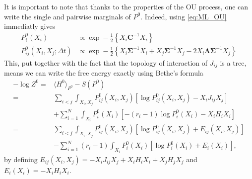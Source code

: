 \documentclass[10pt]{article}
\newcommand{\Lam}{\bm{\Lambda}}
\newcommand{\Sig}{\bm{\Sigma}}
\begin{document}
It is important to note that thanks to the properties of the OU process, one can write the single and pairwise marginals of $P^0$. Indeed, using \ref{eq:ML_OU} immediatly gives
\begin{equation}
  \label{eq:ML_Fullmarginals}
  \begin{split}
    P^0_i(X_i) &\propto \exp-\frac{1}{2}\left\{ X_i\bm{C}^{-1}X_i \right\}\\
    P^0_{ij}(X_i,X_j;\Delta t) &\propto \exp-\frac{1}{2}\left\{ X_i\Sig^{-1} X_i + X_j\Sig^{-1}X_j - 2 X_i \Lam\Sig^{-1} X_j \right\}
  \end{split}
\end{equation}
This, put together with the fact that the topology of interaction of $J_{ij}$ is a tree, means we can write the free energy exactly using Bethe's formula
\begin{equation}
  \label{eq:ML_F0}
  \begin{split}
  -\log Z^0  =&\langle H^0\rangle_{P^0} - S(P^0)\\
   =& \sum_{i<j}\int_{X_i,X_j} P^0_{ij}(X_i,X_j)\left[\log P^0_{ij}(X_i,X_j) - X_iJ_{ij}X_j\right]\\
   & + \sum_{i=1}^N\int_{X_i} P^0_i(X_i)\left[-(r_i-1)\log P^0_i(X_i) - X_iH_iX_i\right]\\
   =& \sum_{i<j}\int_{X_i,X_j} P^0_{ij}(X_i,X_j)\left[\log P^0_{ij}(X_i,X_j) + E_{ij}(X_i,X_j)\right]\\
   & - \sum_{i=1}^N(r_i-1)\int_{X_i} P^0_i(X_i)\left[\log P^0_i(X_i) + E_i(X_i)\right],
  \end{split}
\end{equation}
by defining $E_{ij}(X_i,X_j) = - X_iJ_{ij}X_j + X_iH_iX_i + X_jH_jX_j$ and $E_i(X_i) = -X_iH_iX_i$.
\end{document}
